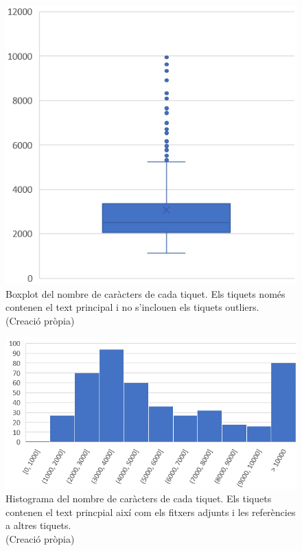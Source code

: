  
\begin{figure}[H]
    \centering
    \includegraphics[width=\textwidth]{boxplot_num_chars_tiquets_outliers.png}
    \caption[Boxplot dels caràcters del text principal de cada tiquet sense outliers]{Boxplot del nombre de caràcters de cada tiquet. Els tiquets només contenen el text principal i no s'inclouen els tiquets outliers. \\ (Creació pròpia)}
    \label{fig:boxplot_num_chars_tiquets_outliers}
\end{figure}


\begin{figure}[H]
    \centering
    \includegraphics[width=\textwidth]{histograma_num_chars_adj_refs.png}
    \caption[Histograma dels caràcters de cada tiquet amb adjunts i referències]{Histograma del nombre de caràcters de cada tiquet. Els tiquets contenen el text princpial així com els fitxers adjunts i les referències a altres tiquets. \\ (Creació pròpia)}
    \label{fig:histograma_num_chars_adj_refs}
\end{figure}

